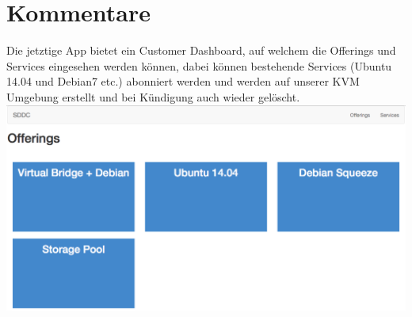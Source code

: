 \documentclass[11pt]{scrartcl}
\begin{document}
\section{Kommentare}

Die jetztige App bietet ein Customer Dashboard, auf welchem die Offerings und 
Services eingesehen werden können, dabei können bestehende Services (Ubuntu 14.04 und Debian7 etc.)
abonniert werden und werden auf unserer KVM Umgebung erstellt und bei Kündigung 
auch wieder gelöscht.
\newline
\includegraphics[width=\textwidth]{dashboard}
\end{document}
